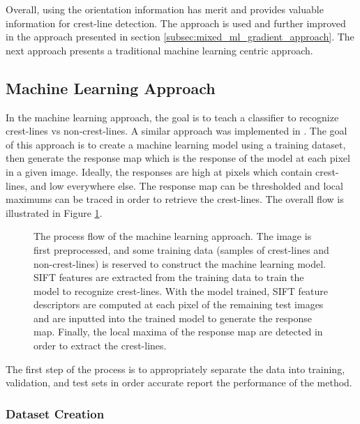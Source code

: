 Overall, using the orientation information has merit and provides valuable information for crest-line detection. The approach is used and further improved in the approach presented in section \ref{subsec:mixed_ml_gradient_approach}. The next approach presents a traditional machine learning centric approach.



\subsection{Machine Learning Approach} \label{subsec:machine_learning_approach}

In the machine learning approach, the goal is to teach a classifier to recognize crest-lines vs non-crest-lines. A similar approach was implemented in \cite{2006_automated_classification_landform_elements,2007_Machine_Learning_tools_automatic_mapping_mars,2013_sar_image_automated_detection_dune_area,BandeiraMarques,2011_neural_network_based_dunal_landform_mapping,vaz_object_based_dune_analysis}. The goal of this approach is to create a machine learning model using a training dataset, then generate the response map which is the response of the model at each pixel in a given image. Ideally, the responses are high at pixels which contain crest-lines, and low everywhere else. The response map can be thresholded and local maximums can be traced in order to retrieve the crest-lines. The overall flow is illustrated in Figure \ref{fig:flow_ml}.

\begin{figure}[H]
	\centering
	\caption{The process flow of the machine learning approach. The image is first preprocessed, and some training data (samples of crest-lines and non-crest-lines) is reserved to construct the machine learning model. SIFT features are extracted from the training data to train the model to recognize crest-lines. With the model trained, SIFT feature descriptors are computed at each pixel of the remaining test images and are inputted into the trained model to generate the response map. Finally, the local maxima of the response map are detected in order to extract the crest-lines. }
	\label{fig:flow_ml}
\end{figure}

The first step of the process is to appropriately separate the data into training, validation, and test sets in order accurate report the performance of the method. 

\subsubsection{Dataset Creation} \label{subsubsec:dataset_creation}

